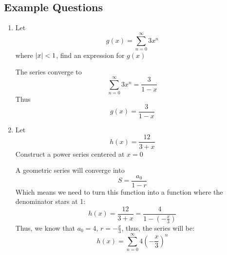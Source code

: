 \documentclass{article}
\numberwithin{equation}{section}
\begin{document}
\subsection{Example Questions}
\begin{enumerate}
    \item Let
    \[
    g(x) = \sum_{n = 0}^{\infty} 3 x^n
    \]
    where $\abs{x} < 1$, find an expression for $g(x)$

    The series converge to 
    \[
        \sum_{n = 0}^{\infty} 3 x^n = \frac{3}{1-x}
    \]
    Thus 
    \[
    g(x) = \frac{3}{1-x}
    \]

    \item Let
    \[
        h(x) = \frac{12}{3+x}
    \]
    Construct a power series centered at $x=0$

    A geometric series will converge into 
    \[
        S = \frac{a_0}{1 - r}
    \]
    Which means we need to turn this function into a function where the denominator stars at 1:
    \[
        h(x) = \frac{12}{3+x} = \frac{4}{1-(-\frac{x}{3})}
    \]
    Thus, we know that $a_0 = 4$, $r = -\frac{x}{3}$, thus, the series will be:
    \[
    h(x) = \sum_{n = 0}^{\infty} 4(-\frac{x}{3})^n
    \]
\end{enumerate}
\end{document}
